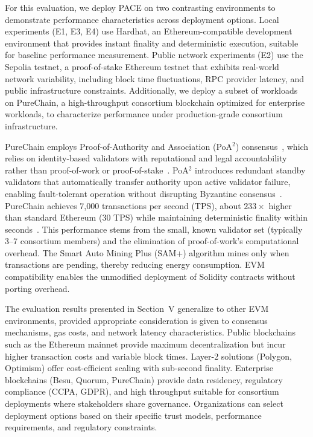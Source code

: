 \documentclass[pdflatex,sn-mathphys-num]{sn-jnl}
\begin{document}
For this evaluation, we deploy PACE on two contrasting environments to demonstrate performance characteristics across deployment options. Local experiments (E1, E3, E4) use Hardhat, an Ethereum-compatible development environment that provides instant finality and deterministic execution, suitable for baseline performance measurement. Public network experiments (E2) use the Sepolia testnet, a proof-of-stake Ethereum testnet that exhibits real-world network variability, including block time fluctuations, RPC provider latency, and public infrastructure constraints. Additionally, we deploy a subset of workloads on PureChain, a high-throughput consortium blockchain optimized for enterprise workloads, to characterize performance under production-grade consortium infrastructure.

PureChain employs Proof-of-Authority and Association (PoA$^2$) consensus~\cite{ICCE2025}, which relies on identity-based validators with reputational and legal accountability rather than proof-of-work or proof-of-stake~\cite{joshi2021feasibility}. PoA$^2$ introduces redundant standby validators that automatically transfer authority upon active validator failure, enabling fault-tolerant operation without disrupting Byzantine consensus~\cite{AHAKONYE2025100354}. PureChain achieves 7,000 transactions per second (TPS), about $233\times$ higher than standard Ethereum (30 TPS) while maintaining deterministic finality within seconds~\cite{KIM2025100397}. This performance stems from the small, known validator set (typically 3--7 consortium members) and the elimination of proof-of-work's computational overhead. The Smart Auto Mining Plus (SAM+) algorithm mines only when transactions are pending, thereby reducing energy consumption. EVM compatibility enables the unmodified deployment of Solidity contracts without porting overhead.

The evaluation results presented in Section~V generalize to other EVM environments, provided appropriate consideration is given to consensus mechanisms, gas costs, and network latency characteristics. Public blockchains such as the Ethereum mainnet provide maximum decentralization but incur higher transaction costs and variable block times. Layer-2 solutions (Polygon, Optimism) offer cost-efficient scaling with sub-second finality. Enterprise blockchains (Besu, Quorum, PureChain) provide data residency, regulatory compliance (CCPA, GDPR), and high throughput suitable for consortium deployments where stakeholders share governance. Organizations can select deployment options based on their specific trust models, performance requirements, and regulatory constraints.
\end{document}
